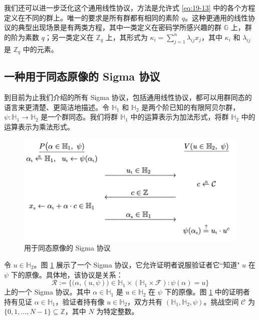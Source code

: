 我们还可以进一步泛化这个通用线性协议，方法是允许式 \ref{eq:19-13} 中的各个方程定义在不同的群上。唯一的要求是所有群都有相同的素阶 $q$。这种更通用的线性协议的典型出现场景是有两类方程，其中一类定义在密码学所感兴趣的群 $\mathbb{G}$ 上，群的阶为素数 $q$；另一类定义在 $\mathbb{Z}_q$ 上，其形式为 $\kappa_i=\sum_{j=1}^n\lambda_{ij}x_j$，其中 $\kappa_i$ 和 $\lambda_{ij}$ 是 $\mathbb{Z}_q$ 中的元素。

\subsection{一种用于同态原像的 Sigma 协议}

到目前为止我们介绍的所有 Sigma 协议，包括通用线性协议，都可以用群同态的语言来更清楚、更简洁地描述。令 $\mathbb{H}_1$ 和 $\mathbb{H}_2$ 是两个阶已知的有限阿贝尔群，$\psi:\mathbb{H}_1\to\mathbb{H}_2$ 是一个群同态。我们将群 $\mathbb{H}_1$ 中的运算表示为加法形式，将群 $\mathbb{H}_2$ 中的运算表示为乘法形式。

\begin{figure}
  \centering
  \includegraphics[width=0.6\linewidth]{figures/chapter19/fig9.png}
  \caption{用于同态原像的 Sigma 协议}
  \label{fig:19-9}
\end{figure}

令 $u\in\mathbb{H}_2$。图 \ref{fig:19-9} 展示了一个 Sigma 协议，它允许证明者说服验证者它``知道" $u$ 在 $\psi$ 下的原像。具体地，该协议是关系：
\begin{equation}\label{eq:19-15}
\mathcal{R}:=\bigg\lbrace
\Big(\alpha,(u,\psi)\Big)\in\mathbb{H}_1\times(\mathbb{H}_1\times\mathcal{F}):\psi(\alpha)=u
\bigg\rbrace
\end{equation}
上的一个 Sigma 协议。其中 $\alpha\in\mathbb{H}_1$ 是 $u\in\mathbb{H}_2$ 在 $\psi$ 下的原像。图 \ref{fig:19-9} 中的证明者持有见证 $\alpha\in\mathbb{H}_1$，验证者持有像 $u\in\mathbb{H}_2$，双方共有 $(\mathbb{H}_1,\mathbb{H}_2,\psi)$。挑战空间 $\mathcal{C}$ 为 $\{0,1,\dots,N-1\}\subseteq\mathbb{Z}$，其中 $N$ 为特定整数。

